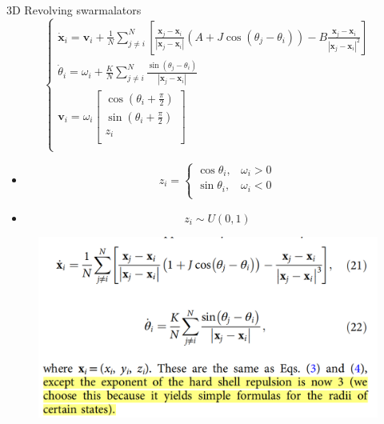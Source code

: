 \documentclass[10pt,aspectratio=43,mathserif,table]{beamer}
\begin{document}
\begin{frame}{3D Revolving swarmalators}
    $$
    \begin{cases}
        \dot{\mathbf{x}}_i=\mathbf{v}_i+\frac{1}{N}\sum_{j\ne i}^N{\left[ \frac{\mathbf{x}_j-\mathbf{x}_i}{\left| \mathbf{x}_j-\mathbf{x}_i \right|}\left( A+J\cos \left( \theta _j-\theta _i \right) \right) -B\frac{\mathbf{x}_j-\mathbf{x}_i}{\left| \mathbf{x}_j-\mathbf{x}_i \right|^2} \right]}\\
        \dot{\theta}_i=\omega _i+\frac{K}{N}\sum_{j\ne i}^N{\frac{\sin \left( \theta _j-\theta _i \right)}{\left| \mathbf{x}_j-\mathbf{x}_i \right|}}\\
        \mathbf{v}_i=\omega _i\left[ \begin{array}{c}
        \cos \left( \theta _i+\frac{\pi}{2} \right)\\
        \sin \left( \theta _i+\frac{\pi}{2} \right)\\
        z_i\\
    \end{array} \right]\\
    \end{cases}
    $$
    \begin{itemize}
        \item 
        $$
        z_i=\begin{cases}
            \cos \theta _i,&\omega _i>0\\
            \sin \theta _i,&\omega _i<0\\
        \end{cases}
        $$
        \item 
        $$
        z_i\sim U\left( 0,1 \right) 
        $$

    \end{itemize}

\end{frame}

\begin{frame}
    \begin{figure}
        \centering
        \includegraphics[width=1\textwidth]{17adjust.jpg}
    \end{figure}
\end{frame}
\end{document}
